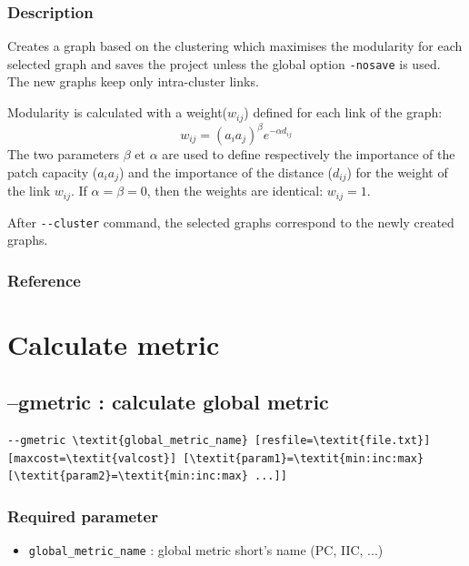 \documentclass[a4paper,10pt]{report}
\begin{document}
\subsubsection{Description}
Creates a graph based on the clustering which maximises the modularity \cite{Newman2006} for each selected graph and saves the project unless the global option \verb|-nosave| is used.
The new graphs keep only intra-cluster links.

Modularity is calculated with a weight($w_{ij}$) defined for each link of the graph:
$$w_{ij} = (a_i a_j)^\beta e^{-\alpha d_{ij}}$$
The two parameters $\beta$ et $\alpha$ are used to define respectively the importance of the patch capacity ($a_i a_j$) and the importance of the distance ($d_{ij}$) for the weight of the link $w_{ij}$. If $\alpha = \beta = 0$, then the weights are identical: $w_{ij} = 1$.  

After \verb|--cluster| command, the selected graphs correspond to the newly created graphs.

\subsubsection{Reference}
\cite{2017_clustering}


\section{Calculate metric}

\subsection{--gmetric : calculate global metric}
\begin{Verbatim}[commandchars=\\\{\}]
--gmetric \textit{global_metric_name} [resfile=\textit{file.txt}] [maxcost=\textit{valcost}] [\textit{param1}=\textit{min:inc:max} [\textit{param2}=\textit{min:inc:max} ...]]
\end{Verbatim}

\subsubsection{Required parameter}
\begin{itemize}
	\item \verb|global_metric_name| : global metric short's name (PC, IIC, ...)
\end{itemize}
\end{document}

